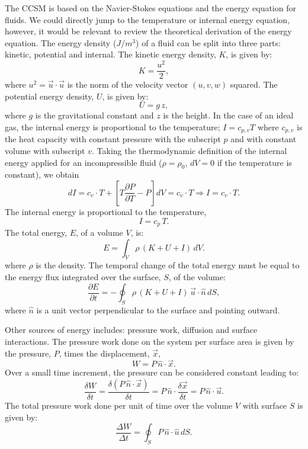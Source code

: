 The CCSM is based on the Navier-Stokes equations and the energy equation for fluids. We could directly jump to the temperature or internal energy equation, however, it would be relevant to review the theoretical derivation of the energy equation. The energy density ($J/m^3$) of a fluid can be split into three parts: kinetic, potential and internal. The kinetic energy density, $K$, is given by:
\begin{equation}
K = \frac{u^2}{2},
\end{equation}
where $u^2 = \vec{u} \cdot \vec{u}$ is the norm of the velocity vector $(u,v,w)$ squared. The potential energy density, $U$, is given by:
\begin{equation}
U = g \, z,
\end{equation}
where $g$ is the gravitational constant and $z$ is the height. In the case of an ideal gas, the internal energy is proportional to the temperature; $I = c_{p,v} T$ where $c_{p,v}$ is the heat capacity with constant pressure with the subscript $p$ and with constant volume with subscript $v$. Taking the thermodynamic definition of the internal energy applied for an incompressible fluid ($\rho = \rho_0$, $dV=0$ if the temperature is constant), we obtain 
\begin{equation}
dI = c_v \cdot T + \left[ T \frac{\partial P}{\partial T} -P \right]dV = c_v \cdot T \Rightarrow I = c_v \cdot T.
\end{equation}
The internal energy is proportional to the temperature,
\begin{equation}\label{int}
I = c_p \, T.
\end{equation}
The total energy, $E$, of a volume $V$, is:
\begin{equation}\label{eqE}
E = \int_V \rho \, (K+U+I)\, dV.
\end{equation}
where $\rho$ is the density. The temporal change of the total energy must be equal to the energy flux integrated over the surface, $S$, of the volume:
\begin{equation}\label{heq}
\frac{\partial E}{\partial t} = -\oint_S \rho \,   (K+U+I) \, \vec{u} \cdot \hat{n} \, dS,
\end{equation}
where $\hat{n}$ is a unit vector perpendicular to the surface and pointing outward.

Other sources of energy includes: pressure work, diffusion and surface interactions. The pressure work done on the system per surface area is given by the pressure, $P$, times the displacement, $\vec{x}$,
\begin{equation}
W = P\,\hat{n}\cdot \vec{x}.
\end{equation}
Over a small time increment, the pressure can be considered constant leading to:
\begin{equation}
\frac{\delta W}{\delta t} = \frac{ \delta(P\,\hat{n}\cdot \vec{x})}{\delta t} = P\,\hat{n} \cdot \frac{\delta \vec{x}}{\delta t} = P\,\hat{n} \cdot \vec{u}.
\end{equation}
The total pressure work done per unit of time over the volume $V$ with surface $S$ is given by:
\begin{equation}\label{work}
\frac{\Delta W}{\Delta t} = \oint_S P \,  \hat{n} \cdot \hat{u} \, dS.
\end{equation}

